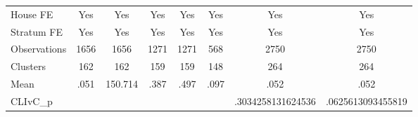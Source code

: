 {\begin{tabular}{l*{7}{c}}
House FE        &      Yes         &      Yes         &      Yes         &      Yes         &      Yes         &      Yes         &      Yes         \\
Stratum FE      &      Yes         &      Yes         &      Yes         &      Yes         &      Yes         &      Yes         &      Yes         \\
\midrule
Observations    &     1656         &     1656         &     1271         &     1271         &      568         &     2750         &     2750         \\
Clusters        &      162         &      162         &      159         &      159         &      148         &      264         &      264         \\
Mean            &     .051         &  150.714         &     .387         &     .497         &     .097         &     .052         &     .052         \\
CLIvC\_p         &                  &                  &                  &                  &                  &.3034258131624536         &.0625613093455819         \\
\bottomrule
\end{tabular}
}
